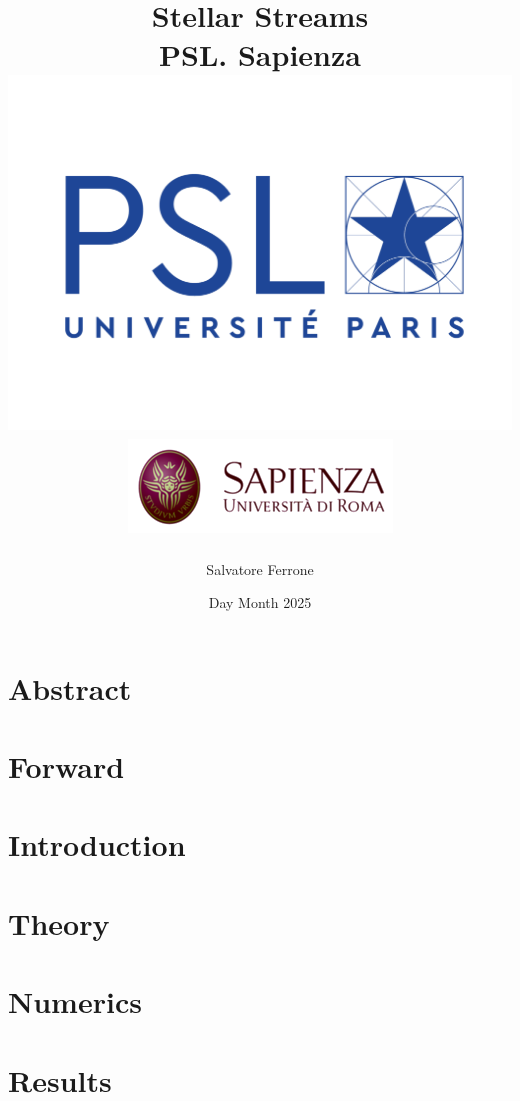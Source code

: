 \documentclass[12pt]{report}
\title{
{Stellar Streams}\\
{\large PSL. Sapienza}\\
{\includegraphics[width=0.5\linewidth]{LOGO-PSL-nov-2017.png}}
{\includegraphics[width=0.6\linewidth]{Uniroma1.png}}
}
\author{Salvatore Ferrone}
\date{Day Month 2025}
\begin{document}
\maketitle

\chapter*{Abstract}


\chapter*{Forward}


\tableofcontents

\chapter{Introduction}


\chapter{Theory}
% 

\chapter{Numerics}
% 

\chapter{Results}
% 




\end{document}
